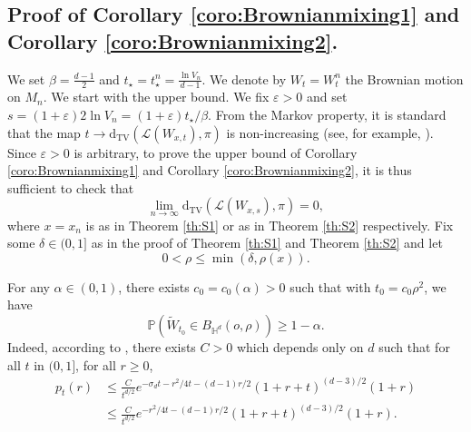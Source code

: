 \documentclass[]{scrartcl}
\newcommand{\DTV}{\mathrm{d_{TV}}}
\newcommand{\cL}{\mathcal L}
\newcommand{\dP}{\p}
\newcommand{\dH}{\mathds H}
\newcommand{\p}{\mathbb{P}}
\newcommand{\eps}{\varepsilon}
\numberwithin{equation}{section}
\numberwithin{figure}{section}
\begin{document}
\subsection{Proof of Corollary \ref{coro:Brownianmixing1} and Corollary \ref{coro:Brownianmixing2}.}


We set $\beta = \frac{d-1}{2}$ and $t_\star = t_\star^n = \frac{\ln V_n}{d-1}$. We denote by $W_t = W_t^n$ the Brownian motion on $M_n$. We start with the upper bound. We fix $\eps > 0$ and set $s =  (1 + \eps) 2 \ln V_n = (1+ \eps) t_\star / \beta $. From the Markov property, it is standard that the map $t \to \DTV(\cL( W_{x,t}) , \pi)$ is non-increasing (see, for example, \cite[Proposition 3.3]{MR2375599}). Since $\eps >0$ is arbitrary, to prove the upper bound of Corollary \ref{coro:Brownianmixing1} and Corollary \ref{coro:Brownianmixing2}, it is thus sufficient to check that 
\begin{equation}\label{eq:ubB}
	\lim_{n \to \infty} \DTV( \cL( W_{x,s}) , \pi )  = 0,  
\end{equation}
where $x = x_n$ is as in Theorem \ref{th:S1} or as in Theorem \ref{th:S2} respectively. Fix some $\delta \in (0,1]$ as in the proof of Theorem \ref{th:S1} and Theorem \ref{th:S2} and let 
\begin{equation}\label{eq:choicerho}
	0 < \rho \leq \min ( \delta, \rho(x)).
\end{equation} 


For any $\alpha \in (0,1)$, there exists $c_0 = c_0(\alpha) >0$ such that with $t_0 = c_0 \rho ^2$, we have 
\begin{equation}\label{eq:condBt}
	\dP ( \widetilde W_{t_0} \in B_{\dH^d} (o,\rho ) )\geq 1 - \alpha. 
\end{equation}
Indeed, according to \cite[Theorem 3.1]{Davies}, there exists $C >0$ which depends only on $d$ such that for all $t$ in $(0,1]$, for all $r \geq 0$, \begin{align}
	p_t(r) &\leq \frac{C}{t^{d/2}}e^{-\sigma_d t-r^2/4t-(d-1)r/2}(1+r+t)^{(d-3)/2}(1+r) \label{eq:bbrownien}
	\\& \leq \frac{C}{t^{d/2}}e^{-r^2/4t-(d-1)r/2}(1+r+t)^{(d-3)/2}(1+r).
\end{align}
\end{document}

